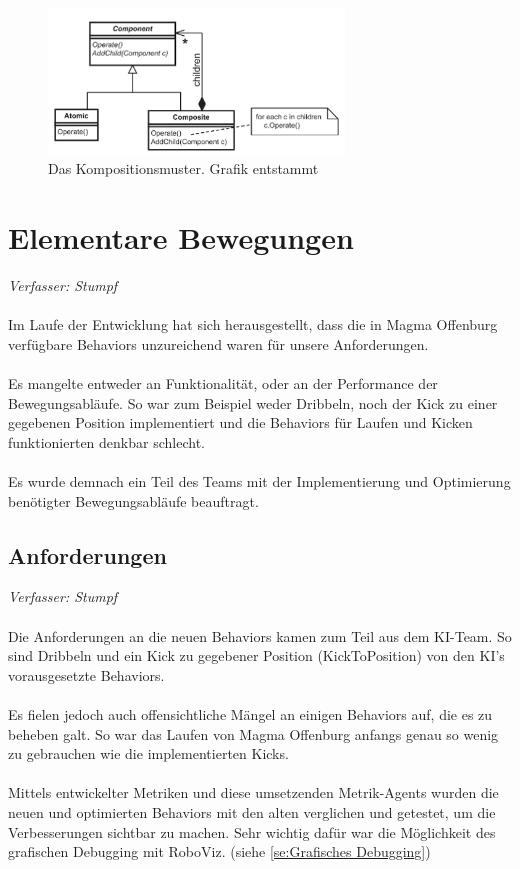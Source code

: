\documentclass[fontsize=12pt,a4paper,final]{scrartcl}[2003/01/01]
\begin{document}
\begin{figure}[ht]
	\centering
  \includegraphics[width=0.7\textwidth]{Grafiken/KI/goal-driven.png}
	\caption{Das Kompositionsmuster. Grafik entstammt \cite[S. 383]{buckland2005programming}}
	\label{fig2}
\end{figure}

\section{Elementare Bewegungen}\label{se:Elementare Bewegungen}
\textit{Verfasser: Stumpf}\\
\\
Im Laufe der Entwicklung hat sich herausgestellt, dass die in Magma Offenburg verfügbare Behaviors unzureichend waren für unsere Anforderungen.\\
\\
Es mangelte entweder an Funktionalität, oder an der Performance der Bewegungsabläufe. So war zum Beispiel weder Dribbeln, noch der Kick zu einer gegebenen Position implementiert und die Behaviors für Laufen und Kicken funktionierten denkbar schlecht.\\
\\
Es wurde demnach ein Teil des Teams mit der Implementierung und Optimierung benötigter Bewegungsabläufe beauftragt.

\subsection{Anforderungen}
\textit{Verfasser: Stumpf}\\
\\
Die Anforderungen an die neuen Behaviors kamen zum Teil aus dem KI-Team. So sind Dribbeln und ein Kick zu gegebener Position (KickToPosition) von den KI's vorausgesetzte Behaviors.\\
\\
Es fielen jedoch auch offensichtliche Mängel an einigen Behaviors auf, die es zu beheben galt. So war das Laufen von Magma Offenburg anfangs genau so wenig zu gebrauchen wie die implementierten Kicks.\\
\\
Mittels entwickelter Metriken und diese umsetzenden Metrik-Agents wurden die neuen und optimierten Behaviors mit den alten verglichen und getestet, um die Verbesserungen sichtbar zu machen. Sehr wichtig dafür war die Möglichkeit des grafischen Debugging mit RoboViz. (siehe \autoref{se:Grafisches Debugging})
\end{document}
